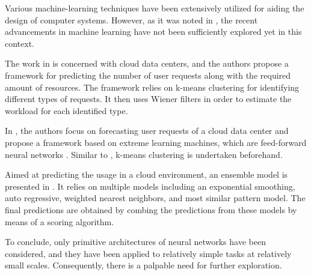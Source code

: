 Various machine-learning techniques have been extensively utilized for aiding
the design of computer systems. However, as it was noted in ,
the recent advancements in machine learning have not been sufficiently explored
yet in this context.

The work in \cite{dabbagh2015} is concerned with cloud data centers, and the
authors propose a framework for predicting the number of user requests along
with the required amount of resources. The framework relies on k-means
clustering \cite{hastie2009} for identifying different types of requests. It
then uses Wiener filters in order to estimate the workload for each identified
type.

In \cite{ismaeel2015}, the authors focus on forecasting user requests of a cloud
data center and propose a framework based on extreme learning machines, which
are feed-forward neural networks \cite{hastie2009}. Similar to
\cite{dabbagh2015}, k-means clustering is undertaken beforehand.

Aimed at predicting the  usage in a cloud environment, an ensemble model
\cite{hastie2009} is presented in \cite{cao2014}. It relies on multiple models
including an exponential smoothing, auto regressive, weighted nearest neighbors,
and most similar pattern model. The final predictions are obtained by combing
the predictions from these models by means of a scoring algorithm.

To conclude, only primitive architectures of neural networks have been
considered, and they have been applied to relatively simple tasks at relatively
small scales. Consequently, there is a palpable need for further exploration.
